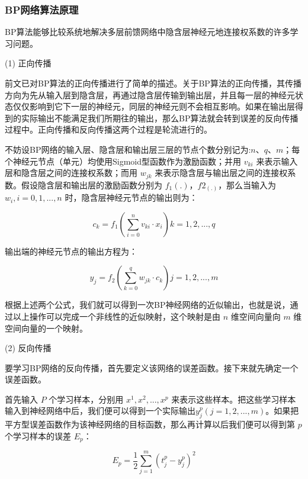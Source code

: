 \documentclass[UTF8]{ctexart}
\begin{document}
\subsubsection{BP网络算法原理}

BP算法能够比较系统地解决多层前馈网络中隐含层神经元地连接权系数的许多学习问题。 \par

(1) 正向传播 \par

前文已对BP算法的正向传播进行了简单的描述。关于BP算法的正向传播，其传播方向为先从输入层到隐含层，再通过隐含层传输到输出层，并且每一层的神经元状态仅仅影响到它下一层的神经元，同层的神经元则不会相互影响。如果在输出层得到的实际输出不能满足我们所期往的输出，那么BP算法就会转到误差的反向传播过程中。正向传播和反向传播这两个过程是轮流进行的。 \par

不妨设BP网络的输入层、隐含层和输出层三层的节点个数分别记为:$n$、$q$、$m$；每个神经元节点（单元）均使用Sigmoid型函数作为激励函数；并用 $v_{ki}$ 来表示输入层和隐含层之间的连接权系数；而用 $w_{jk}$ 来表示隐含层与输出层之间的连接权系数。假设隐含层和输出层的激励函数分别为 $f_1(.)$，$f2_(.)$，那么当输入为 $w_i,i=0,1,...,n$ 时，隐含层神经元节点的输出则为：

\begin{equation} 
c_k = f_1(\sum_{i=0}^{n} v_{ki} \cdot x_i) k = 1,2,...,q
\end{equation}

输出端的神经元节点的输出方程为：

\begin{equation} 
y_j = f_2(\sum_{k=0}^{q} w_{jk} \cdot c_k) j = 1,2,...,m
\end{equation}

根据上述两个公式，我们就可以得到一次BP神经网络的近似输出，也就是说，通过以上操作可以完成一个非线性的近似映射，这个映射是由 $n$ 维空间向量向 $m$ 维空间向量的一个映射。

(2) 反向传播 \par

要学习BP网络的反向传播，首先要定义该网络的误差函数。接下来就先确定一个误差函数。 \par

首先输入 $P$ 个学习样本，分别用 $x^1,x^2,...,x^p$ 来表示这些样本。把这些学习样本输入到神经网络中后，我们便可以得到一个实际输出$y_j^p(j=1,2,...,m)$。如果把平方型误差函数作为该神经网络的目标函数，那么再计算以后我们便可以得到第 $p$ 个学习样本的误差 $E_p$：

\begin{equation} 
E_p=\frac{1}{2} \sum_{j=1}^{m}  (t_{j}^{p} - y_{j}^{p})^2
\end{equation}
\end{document}
